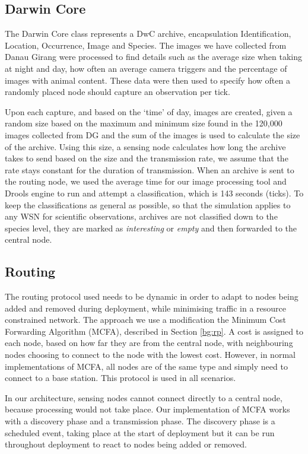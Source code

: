 \subsection{Darwin Core}
The Darwin Core class represents a DwC archive, encapsulation Identification, Location, Occurrence, Image and Species. The images we have collected from Danau Girang were processed to find details such as the average size when taking at night and day, how often an average camera triggers and the percentage of images with animal content. These data were then used to specify how often a randomly placed node should capture an observation per tick.

Upon each capture, and based on the `time' of day, images are created, given a random size based on the maximum and minimum size found in the 120,000 images collected from DG and the sum of the images is used to calculate the size of the archive. Using this size, a sensing node calculates how long the archive takes to send based on the size and the transmission rate, we assume that the rate stays constant for the duration of transmission.
When an archive is sent to the routing node, we used the average time for our image processing tool and Drools engine to run and attempt a classification, which is 143 seconds (ticks). To keep the classifications as general as possible, so that the simulation applies to any WSN for scientific observations, archives are not classified down to the species level, they are marked as \textit{interesting} or \textit{empty} and then forwarded to the central node.

\subsection{Routing}
The routing protocol used needs to be dynamic in order to adapt to nodes being added and removed during deployment, while minimising traffic in a resource constrained network. The approach we use a modification the Minimum Cost Forwarding Algorithm (MCFA), described in Section \ref{bg:rp}. A cost is assigned to each node, based on how far they are from the central node, with neighbouring nodes choosing to connect to the node with the lowest cost. However, in normal implementations of MCFA, all nodes are of the same type and simply need to connect to a base station. This protocol is used in all scenarios.

In our architecture, sensing nodes cannot connect directly to a central node, because processing would not take place. Our implementation of MCFA works with a discovery phase and a transmission phase. The discovery phase is a scheduled event, taking place at the start of deployment but it can be run throughout deployment to react to nodes being added or removed. 

